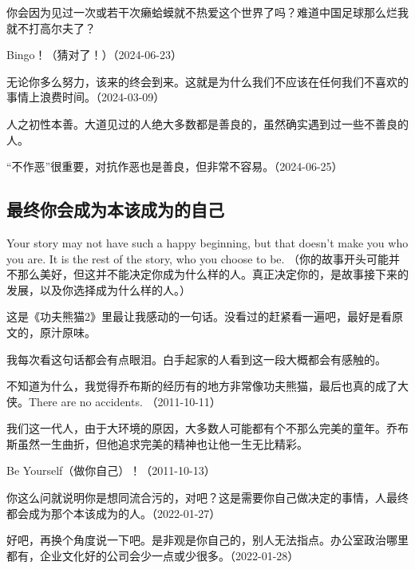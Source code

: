 你会因为见过一次或若干次癞蛤蟆就不热爱这个世界了吗？难道中国足球那么烂我就不打高尔夫了？


Bingo！（猜对了！）（2024-06-23）


无论你多么努力，该来的终会到来。这就是为什么我们不应该在任何我们不喜欢的事情上浪费时间。（2024-03-09）


人之初性本善。大道见过的人绝大多数都是善良的，虽然确实遇到过一些不善良的人。


“不作恶”很重要，对抗作恶也是善良，但非常不容易。（2024-06-25）

\subsection{最终你会成为本该成为的自己}

Your story may not have such a happy beginning, but that doesn't make you who you are. It is the rest of the story, who you choose to be. （你的故事开头可能并不那么美好，但这并不能决定你成为什么样的人。真正决定你的，是故事接下来的发展，以及你选择成为什么样的人。）

这是《功夫熊猫2》里最让我感动的一句话。没看过的赶紧看一遍吧，最好是看原文的，原汁原味。

我每次看这句话都会有点眼泪。白手起家的人看到这一段大概都会有感触的。

不知道为什么，我觉得乔布斯的经历有的地方非常像功夫熊猫，最后也真的成了大侠。There are no accidents. （2011-10-11）

我们这一代人，由于大环境的原因，大多数人可能都有个不那么完美的童年。乔布斯虽然一生曲折，但他追求完美的精神也让他一生无比精彩。

Be Yourself（做你自己）！（2011-10-13）


你这么问就说明你是想同流合污的，对吧？这是需要你自己做决定的事情，人最终都会成为那个本该成为的人。（2022-01-27）

好吧，再换个角度说一下吧。是非观是你自己的，别人无法指点。办公室政治哪里都有，企业文化好的公司会少一点或少很多。（2022-01-28）

